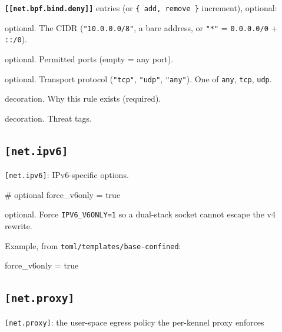 \textbf{\texttt{{[}{[}net.bpf.bind.deny{]}{]}}} entries (or
\texttt{\{\ add,\ remove\ \}} increment), optional:

\begin{description}
\tightlist
\item[\texttt{cidr}]
optional. The CIDR (\texttt{"10.0.0.0/8"}, a bare address, or
\texttt{"*"} = \texttt{0.0.0.0/0} + \texttt{::/0}).
\item[\texttt{ports}]
optional. Permitted ports (empty = any port).
\item[\texttt{protocol}]
optional. Transport protocol (\texttt{"tcp"}, \texttt{"udp"},
\texttt{"any"}). One of \texttt{any}, \texttt{tcp}, \texttt{udp}.
\item[\texttt{reason}]
decoration. Why this rule exists (required).
\item[\texttt{threats}]
decoration. Threat tags.
\end{description}

\hypertarget{net.ipv6}{%
\subsection{\texorpdfstring{\texttt{{[}net.ipv6{]}}}{{[}net.ipv6{]}}}\label{net.ipv6}}

\texttt{{[}net.ipv6{]}}: IPv6-specific options.

\begin{kennelcode}
# optional
force_v6only = true
\end{kennelcode}

\begin{description}
\tightlist
\item[\texttt{force\_v6only}]
optional. Force \texttt{IPV6\_V6ONLY=1} so a dual-stack socket cannot
escape the v4 rewrite.
\end{description}

Example, from \texttt{toml/templates/base-confined}:

\begin{kennelcode}
force_v6only = true
\end{kennelcode}

\hypertarget{net.proxy}{%
\subsection{\texorpdfstring{\texttt{{[}net.proxy{]}}}{{[}net.proxy{]}}}\label{net.proxy}}

\texttt{{[}net.proxy{]}}: the user-space egress policy the per-kennel
proxy enforces

